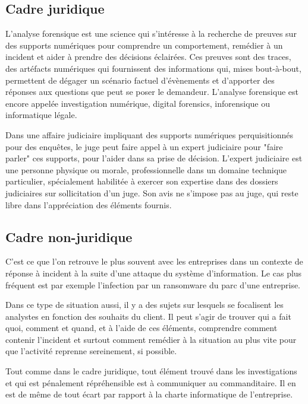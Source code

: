 
\subsection{Cadre juridique}

L'analyse forensique est une science qui s'intéresse à la recherche de preuves sur des supports numériques pour comprendre un comportement, remédier à un incident et aider à prendre des décisions éclairées. Ces preuves sont des traces, des artéfacts numériques qui fournissent des informations qui, mises bout-à-bout, permettent de dégager un scénario factuel d'évènements et d'apporter des réponses aux questions que peut se poser le demandeur. L'analyse forensique est encore appelée investigation numérique, digital forensics, inforensique ou informatique légale.


Dans une affaire judiciaire impliquant des supports numériques perquisitionnés pour des enquêtes, le juge peut faire appel à un expert judiciaire pour "faire parler" ces supports, pour l'aider dans sa prise de décision. L'expert judiciaire est une personne physique ou morale, professionnelle dans un domaine technique particulier, spécialement habilitée à exercer son expertise dans des dossiers judiciaires sur sollicitation d'un juge. Son avis ne s'impose pas au juge, qui reste libre dans l'appréciation des éléments fournis.


\subsection{Cadre non-juridique}

C'est ce que l'on retrouve le plus souvent avec les entreprises dans un contexte de réponse à incident à la suite d'une attaque du système d'information. Le cas plus fréquent est par exemple l'infection par un ransomware du parc d'une entreprise.

Dans ce type de situation aussi, il y a des sujets sur lesquels se focalisent les analystes en fonction des souhaits du client. Il peut s'agir de trouver qui a fait quoi, comment et quand, et à l'aide de ces éléments, comprendre comment contenir l'incident et surtout comment remédier à la situation au plus vite pour que l'activité reprenne sereinement, si possible.

Tout comme dans le cadre juridique, tout élément trouvé dans les investigations et qui est pénalement répréhensible est à communiquer au commanditaire. Il en est de même de tout écart par rapport à la charte informatique de l'entreprise.

